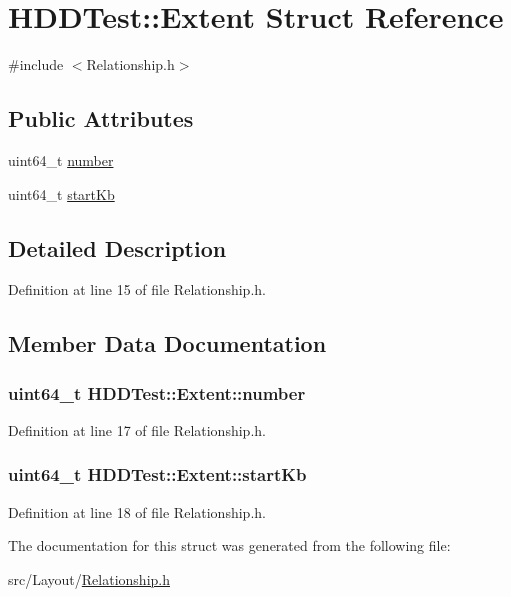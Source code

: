 \hypertarget{struct_h_d_d_test_1_1_extent}{\section{H\-D\-D\-Test\-:\-:Extent Struct Reference}
\label{struct_h_d_d_test_1_1_extent}
}


{\ttfamily \#include $<$Relationship.\-h$>$}

\subsection*{Public Attributes}
\begin{DoxyCompactItemize}
\item 
uint64\-\_\-t \hyperlink{struct_h_d_d_test_1_1_extent_ac0deb3659d689a07ccbe70e29a5e53a1}{number}
\item 
uint64\-\_\-t \hyperlink{struct_h_d_d_test_1_1_extent_aec7fca41414d25591790a92c6d43786c}{start\-Kb}
\end{DoxyCompactItemize}


\subsection{Detailed Description}


Definition at line 15 of file Relationship.\-h.



\subsection{Member Data Documentation}
\hypertarget{struct_h_d_d_test_1_1_extent_ac0deb3659d689a07ccbe70e29a5e53a1}{
\subsubsection[{number}]{\setlength{\rightskip}{0pt plus 5cm}uint64\-\_\-t H\-D\-D\-Test\-::\-Extent\-::number}}\label{struct_h_d_d_test_1_1_extent_ac0deb3659d689a07ccbe70e29a5e53a1}


Definition at line 17 of file Relationship.\-h.

\hypertarget{struct_h_d_d_test_1_1_extent_aec7fca41414d25591790a92c6d43786c}{
\subsubsection[{start\-Kb}]{\setlength{\rightskip}{0pt plus 5cm}uint64\-\_\-t H\-D\-D\-Test\-::\-Extent\-::start\-Kb}}\label{struct_h_d_d_test_1_1_extent_aec7fca41414d25591790a92c6d43786c}


Definition at line 18 of file Relationship.\-h.



The documentation for this struct was generated from the following file\-:\begin{DoxyCompactItemize}
\item 
src/\-Layout/\hyperlink{_relationship_8h}{Relationship.\-h}\end{DoxyCompactItemize}
